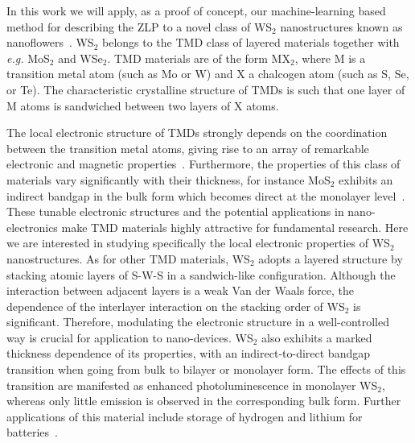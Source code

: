In this work we will apply, as a proof of concept, our machine-learning based method
for describing the ZLP to a novel class of WS$_2$ nanostructures known
as nanoflowers~\cite{SabryaWS2}.
%
WS$_2$ belongs to the TMD class of layered materials together with {\it e.g.}
MoS$_2$ and WSe$_2$.
%
TMD materials are of the form MX$_2$, where M is a 
transition metal atom (such as Mo or W) and X a chalcogen atom (such as S, Se, or Te). 
%
The characteristic crystalline structure of TMDs is such that
one layer of M atoms is sandwiched between two layers of X atoms.

The local electronic structure of TMDs strongly depends on the coordination 
between the transition metal atoms, giving rise to an array of remarkable electronic
and magnetic properties~\cite{Chhowalla:2013}.
%
Furthermore, the properties of this class of materials vary significantly
with their thickness, for instance MoS$_2$ exhibits an indirect bandgap
in the bulk form which becomes direct at the monolayer level~\cite{Splendiani:2010}.
%
These tunable electronic structures and the potential applications in
nano-electronics make TMD materials highly attractive for fundamental research. 
%
Here we are interested in studying specifically the local electronic
properties of WS$_2$ nanostructures.
%
As for other TMD materials, WS$_2$ adopts a layered structure 
by stacking atomic layers of S-W-S in a sandwich-like configuration. 
%
Although the interaction between adjacent layers is a weak Van der Waals 
force, the dependence of the interlayer interaction on the stacking 
order of WS$_2$ is significant.
%
Therefore, modulating the electronic
structure in a well-controlled way is crucial for application to
nano-devices.
%
WS$_2$ also exhibits a marked thickness dependence of
its properties, with an indirect-to-direct bandgap transition when going
from bulk to bilayer or monolayer form.
%
The effects of this transition are manifested as enhanced
photoluminescence in monolayer WS$_2$, whereas only little emission is observed in
the corresponding bulk form.
%
Further applications of this material include storage of hydrogen 
and lithium for batteries~\cite{Bhandavat:2012}.

